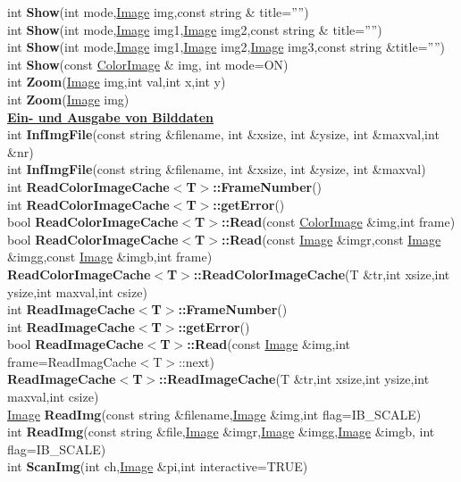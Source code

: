 \documentclass[10pt,titlepage]{article}
\newcommand{\subtitle}[1]{{\noindent\bf#1}}
\def\functionlistentry#1#2#3#4#5#6{\noindent #1 {\bf #2}(#3) \dotfill #6\\}
\begin{document}
{{\functionlistentry{int}{Show}{int mode,\hyperlink{Image}{Image} img,const string \& title=''''}{89}{Visualisierung}{}
\functionlistentry{int}{Show}{int mode,\hyperlink{Image}{Image} img1,\hyperlink{Image}{Image} img2,const string \& title=''''}{90}{Visualisierung}{}
\functionlistentry{int}{Show}{int mode,\hyperlink{Image}{Image} img1,\hyperlink{Image}{Image} img2,\hyperlink{Image}{Image} img3,const string \&title=''''}{91}{Visualisierung}{}
\functionlistentry{int}{Show}{const \hyperlink{ColorImage}{ColorImage} \& img, int mode=ON}{92}{Visualisierung}{}
\functionlistentry{int}{Zoom}{\hyperlink{Image}{Image} img,int val,int x,int y}{93}{Visualisierung}{}
\functionlistentry{int}{Zoom}{\hyperlink{Image}{Image} img}{94}{Visualisierung}{}

\subtitle{\hyperlink{SECTION:imageio}{Ein- und Ausgabe von Bilddaten}}\\
\functionlistentry{int}{InfImgFile}{const string \&filename, int \&xsize, int \&ysize, int \&maxval,int \&nr}{117}{imageio}{}
\functionlistentry{int}{InfImgFile}{const string \&filename, int \&xsize, int \&ysize, int \&maxval}{118}{imageio}{}
\functionlistentry{int}{ReadColorImageCache$<$T$>$::FrameNumber}{}{137}{imageio}{}
\functionlistentry{int}{ReadColorImageCache$<$T$>$::getError}{}{139}{imageio}{}
\functionlistentry{bool}{ReadColorImageCache$<$T$>$::Read}{const \hyperlink{ColorImage}{ColorImage} \&img,int frame}{134}{imageio}{}
\functionlistentry{bool}{ReadColorImageCache$<$T$>$::Read}{const \hyperlink{Image}{Image} \&imgr,const \hyperlink{Image}{Image} \&imgg,const \hyperlink{Image}{Image} \&imgb,int frame}{135}{imageio}{}
\functionlistentry{}{ReadColorImageCache$<$T$>$::ReadColorImageCache}{T \&tr,int xsize,int ysize,int maxval,int csize}{132}{imageio}{}
\functionlistentry{int}{ReadImageCache$<$T$>$::FrameNumber}{}{136}{imageio}{}
\functionlistentry{int}{ReadImageCache$<$T$>$::getError}{}{138}{imageio}{}
\functionlistentry{bool}{ReadImageCache$<$T$>$::Read}{const \hyperlink{Image}{Image} \&img,int frame=ReadImagCache$<$T$>$::next}{133}{imageio}{}
\functionlistentry{}{ReadImageCache$<$T$>$::ReadImageCache}{T \&tr,int xsize,int ysize,int maxval,int csize}{131}{imageio}{}
\functionlistentry{\hyperlink{Image}{Image}}{ReadImg}{const string \&filename,\hyperlink{Image}{Image} \&img,int flag=IB\_SCALE}{113}{imageio}{}
\functionlistentry{int}{ReadImg}{const string \&file,\hyperlink{Image}{Image} \&imgr,\hyperlink{Image}{Image} \&imgg,\hyperlink{Image}{Image} \&imgb, int flag=IB\_SCALE}{115}{imageio}{}
\functionlistentry{int}{ScanImg}{int ch,\hyperlink{Image}{Image} \&pi,int interactive=TRUE}{148}{imageio}{}
}}
\end{document}
